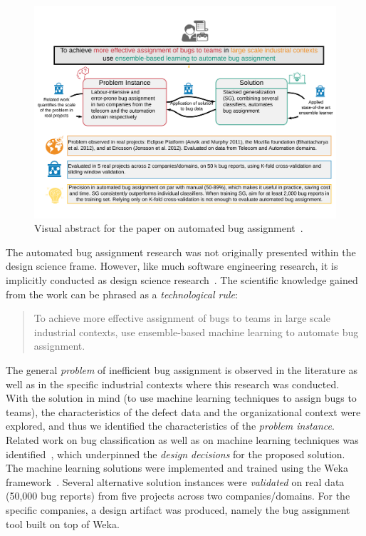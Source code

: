 \documentclass[graybox]{svmult}
\begin{document}
\begin{figure}[t]
\begin{center}
\includegraphics[width=\columnwidth, trim={5mm 20mm 5mm 20mm },clip]{Figures/VATemplateJonsson.pdf}
\caption{Visual abstract for the paper on automated bug assignment~\cite{JonssonBug15}.}
\label{fig:BugAssignment}
\end{center}
\end{figure}

The automated bug assignment research was not originally presented within the design science frame. However, like much software engineering research, it is implicitly conducted as design science research~\cite{Engstrom19arxiv}. 
The scientific knowledge gained from the work can be phrased as a \emph{technological rule}:
\begin{quote}{To achieve more effective assignment of bugs to teams in large scale industrial contexts, use ensemble-based machine learning to automate bug assignment.~\cite{StoreyESEM17}}\end{quote}

The general \emph{problem} of inefficient bug assignment is observed in the literature as well as in the specific industrial contexts where this research was conducted. With the solution in mind (to use machine learning techniques to assign bugs to teams), the characteristics of the defect data and the organizational context were explored, and thus we identified the characteristics of the \emph{problem instance}. Related work on bug classification as well as on machine learning techniques was identified~\cite{Borg2013EMSE}, which underpinned the \emph{design decisions} for the proposed solution. The machine learning solutions were implemented and trained using the Weka framework~\cite{hall_weka_2009}. Several alternative solution instances were \emph{validated} on real data (50,000 bug reports) from five projects across two companies/domains. For the specific companies, a design artifact was produced, namely the bug assignment tool built on top of Weka.
\end{document}
